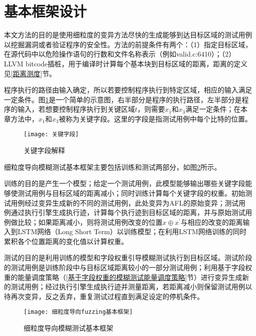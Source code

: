\section{基本框架设计}

本文方法的目的是使用细粒度的变异方法尽快的生成能够到达目标区域的测试用例以挖掘漏洞或者验证程序的安全性。方法的前提条件有两个：（1）指定目标区域，在源代码中以危险操作语句的行数和文件名称表示（例如valid.c:6410）；（2）LLVM bitcode插桩，用于编译时计算每个基本块到目标区域的距离，距离的定义见\ref{距离测度}节。

程序执行的路径由输入确定，所以若要控制程序执行到特定区域，相应的输入满足一定条件。图\ref{关键字段}是一个简单的示意图，右半部分是程序的执行路径，左半部分是程序的输入，若想要控制程序执行到关键区域$t$，则需要$x_1$和$x_3$满足一定条件；在本章方法中，$x_1$和$x_3$被称为关键字段。这里的字段是指测试用例中每个比特的位置。

\begin{figure}[htb]
\begin{center}
\texttt{[image: 关键字段]}
\end{center}
\caption{关键字段解释}
\label{关键字段}
\end{figure}


细粒度导向模糊测试基本框架主要包括训练和测试两部分，如图\ref{细粒度导向fuzzing基本框架}所示。

训练的目的是产生一个模型；给定一个测试用例，此模型能够输出哪些关键字段能够使测试用例与目标区域的距离减小；同时训练计算每个关键字段的权重。初始测试用例经过变异生成新的不同的测试用例，此处变异为AFL的原始变异；测试用例通过执行引擎生成执行迹，计算每个执行迹到目标区域的距离，并与原始测试用例做比较；如果距离减小，则将测试用例改变的位置$x \oplus x^{'}$与相应的改变的距离输入到LSTM网络（Long Short Term）以训练模型；在利用LSTM网络训练的同时累积各个位置距离的变化值以计算权重。

测试的目的是利用训练的模型和字段权重引导模糊测试执行到目标区域。测试阶段的测试用例是训练阶段中与目标区域距离较小的一部分测试用例；利用基于字段权重的能量调度策略（\ref{基于字段权重的模糊测试能量调度策略}节）进行变异生成新的测试用例；经过执行引擎生成执行迹并测量距离，若距离减小则保留测试用例以待再次变异，反之丢弃，重复测试过程直到满足设定的停机条件。

\begin{figure}[htb]
\begin{center}
\texttt{[image: 细粒度导向fuzzing基本框架]}
\end{center}
\caption{细粒度导向模糊测试基本框架}
\label{细粒度导向fuzzing基本框架}
\end{figure}

